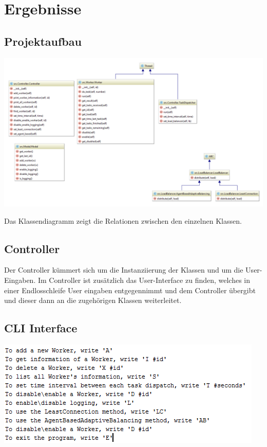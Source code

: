 
\section{Ergebnisse}
\label{sec:Ergebnisse}



\subsection{Projektaufbau}

\begin{minipage}{\linewidth}
	\centering
	\includegraphics[width=1\linewidth]{images/class_diagram}
\end{minipage}

Das Klassendiagramm zeigt die Relationen zwischen den einzelnen Klassen. 

\subsection{Controller}
Der Controller kümmert sich um die Instanziierung der Klassen und um die User-Eingaben.
Im Controller ist zusätzlich das User-Interface zu finden, welches in einer Endlosschleife User eingaben entgegennimmt und dem Controller übergibt und dieser dann an die zugehörigen Klassen weiterleitet.

\subsection{CLI Interface}
\begin{minipage}{\linewidth}
	\centering
	\includegraphics[width=0.8\linewidth]{images/cli_interface}
\end{minipage}


